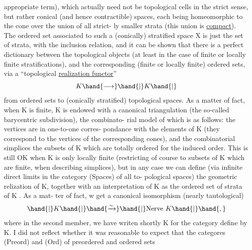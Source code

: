 
appropriate term), which actually need not be topological cells in the
strict sense, but rather conical (and hence contractible) spaces,
each being homeomorphic to the cone  over the union of all strict-%
\margin{$\times$} ly smaller strata (this union is \uline{compact}). The ordered set associated
to such a (conically) stratified space X is just the set of \inserted{[closed]} strata,
with the inclusion relation, and it can be shown that there is a perfect
dictionary between the topological objects (at least in the case of
finite or locally finite stratifications), and the corresponding (finite
or locally finite) ordered sets, via a ``topological \uline{realization functor}''
\[ K \hand{\longrightarrow} \hand{|}K\hand{|} \]
from ordered sets to (conically stratified) topological spaces. As a
\margin{$\times$} matter of fact, when K is finite, \hand{|}K\hand{|} is endowed with a canonical
triangulation (the so-called barycentric subdivision), the combinato-%
rial model of which  is as follows: the vertices are in one-to-one corres-%
pondance with the elements of K (they correspond to the vertices of the
corresponding cones), and the combinatorial simplices  the  subsets
of K which are totally ordered for the induced order. This is still OK
when K is only locally finite (restricting of course to subsets of K
which are finite, when describing simplices), but in any case we can
define (via infinite direct limits in the category (Spaces) of all to-%
pological spaces) the geometric relization of K,  together with
an interpretation of K as the ordered set of strata of \hand{|}K\hand{|} . As a mat-%
ter of fact, w get a canonical isomorphism (nearly tautological)
\[ \hand{|}K\hand{|} \hand{\xrightarrow{\sim}} \hand{|}\text{Nerve } K\hand{|} \hand{,} \]
where in the second member, we have writen shortly K for the category
define by K. I did not reflect whether it was reasonable to expect
that the categores (Preord) and (Ord) of preordered and ordered sets
